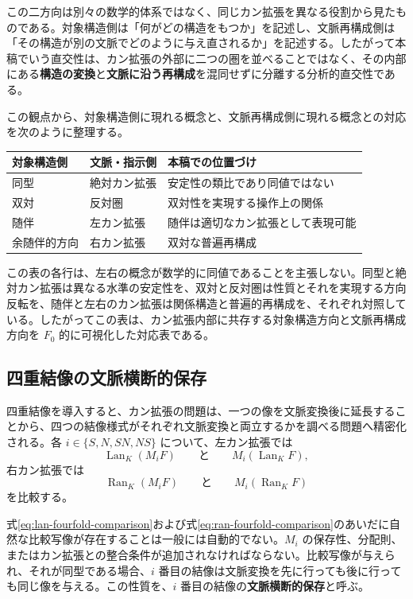 \documentclass[a4paper,11pt]{ltjsarticle}
\theoremstyle{definition}
\theoremstyle{plain}
\newcommand{\Lan}{\operatorname{Lan}}
\newcommand{\Ran}{\operatorname{Ran}}
\begin{document}
この二方向は別々の数学的体系ではなく、同じカン拡張を異なる役割から見たものである。対象構造側は「何がどの構造をもつか」を記述し、文脈再構成側は「その構造が別の文脈でどのように与え直されるか」を記述する。したがって本稿でいう直交性は、カン拡張の外部に二つの圏を並べることではなく、その内部にある\textbf{構造の変換}と\textbf{文脈に沿う再構成}を混同せずに分離する分析的直交性である。

この観点から、対象構造側に現れる概念と、文脈再構成側に現れる概念との対応を次のように整理する。
\begin{center}
\begin{tabular}{p{} p{} p{}}
\toprule
対象構造側 & 文脈・指示側 & 本稿での位置づけ \\
\midrule
同型 & 絶対カン拡張 & 安定性の類比であり同値ではない \\
双対 & 反対圏 & 双対性を実現する操作上の関係 \\
随伴 & 左カン拡張 & 随伴は適切なカン拡張として表現可能 \\
余随伴的方向 & 右カン拡張 & 双対な普遍再構成 \\
\bottomrule
\end{tabular}
\end{center}
この表の各行は、左右の概念が数学的に同値であることを主張しない。同型と絶対カン拡張は異なる水準の安定性を、双対と反対圏は性質とそれを実現する方向反転を、随伴と左右のカン拡張は関係構造と普遍的再構成を、それぞれ対照している。したがってこの表は、カン拡張内部に共存する対象構造方向と文脈再構成方向を $F_0$ 的に可視化した対応表である。

\subsection{四重結像の文脈横断的保存}

四重結像を導入すると、カン拡張の問題は、一つの像を文脈変換後に延長することから、四つの結像様式がそれぞれ文脈変換と両立するかを調べる問題へ精密化される。各 $i\in\{S,N,SN,NS\}$ について、左カン拡張では
\begin{equation}
 \Lan_K(M_iF)
 \qquad\text{と}\qquad
 M_i(\Lan_KF),
 \label{eq:lan-fourfold-comparison}
\end{equation}
右カン拡張では
\begin{equation}
 \Ran_K(M_iF)
 \qquad\text{と}\qquad
 M_i(\Ran_KF)
 \label{eq:ran-fourfold-comparison}
\end{equation}
を比較する。

式\eqref{eq:lan-fourfold-comparison}および式\eqref{eq:ran-fourfold-comparison}のあいだに自然な比較写像が存在することは一般には自動的でない。$M_i$ の保存性、分配則、またはカン拡張との整合条件が追加されなければならない。比較写像が与えられ、それが同型である場合、$i$ 番目の結像は文脈変換を先に行っても後に行っても同じ像を与える。この性質を、$i$ 番目の結像の\textbf{文脈横断的保存}と呼ぶ。
\end{document}
